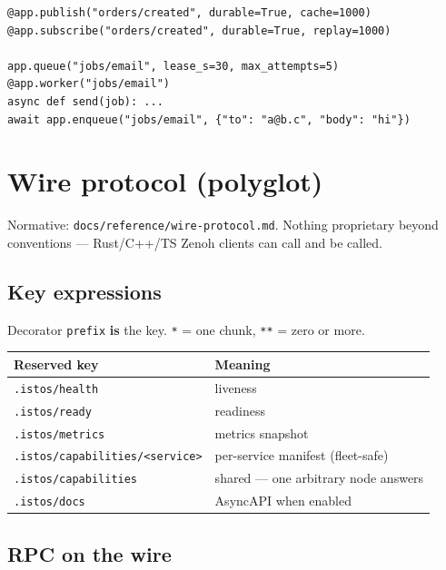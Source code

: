 \documentclass[11pt,a4paper]{article}
\begin{document}
\begin{lstlisting}
@app.publish("orders/created", durable=True, cache=1000)
@app.subscribe("orders/created", durable=True, replay=1000)

app.queue("jobs/email", lease_s=30, max_attempts=5)
@app.worker("jobs/email")
async def send(job): ...
await app.enqueue("jobs/email", {"to": "a@b.c", "body": "hi"})
\end{lstlisting}

\section{Wire protocol (polyglot)}
\label{sec:wire}

Normative: \texttt{docs/reference/wire-protocol.md}. Nothing proprietary beyond
conventions --- Rust/C++/TS Zenoh clients can call and be called.

\subsection{Key expressions}

Decorator \texttt{prefix} \textbf{is} the key. \texttt{*} = one chunk,
\texttt{**} = zero or more.

\begin{center}
\begin{tabular}{@{}ll@{}}
\toprule
Reserved key & Meaning \\
\midrule
\texttt{.istos/health} & liveness \\
\texttt{.istos/ready} & readiness \\
\texttt{.istos/metrics} & metrics snapshot \\
\texttt{.istos/capabilities/<service>} & per-service manifest (fleet-safe) \\
\texttt{.istos/capabilities} & shared --- one arbitrary node answers \\
\texttt{.istos/docs} & AsyncAPI when enabled \\
\bottomrule
\end{tabular}
\end{center}

\subsection{RPC on the wire}
\end{document}
